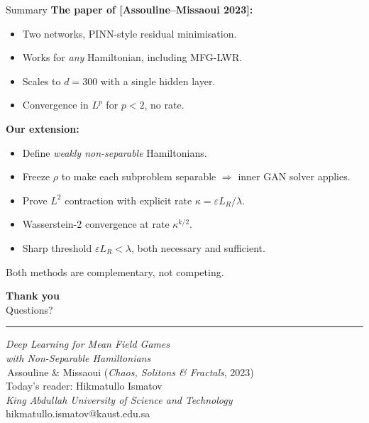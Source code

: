 \documentclass[10pt,aspectratio=169]{beamer}
\newcommand{\eps}{\varepsilon}
\newcommand{\teal}[1]{\textcolor{kaustteal}{#1}}
\newcommand{\blue}[1]{\textcolor{kaustblue}{#1}}
\newcommand{\citehl}[1]{\textcolor{kaustblue!80!black}{\textbf{[#1]}}}
\begin{document}
\begin{frame}{Summary}
\textbf{The paper of \citehl{Assouline--Missaoui 2023}:}
\begin{itemize}\setlength\itemsep{1pt}
  \item Two networks, PINN-style residual minimisation.
  \item Works for \emph{any} Hamiltonian, including MFG-LWR.
  \item Scales to $d=300$ with a single hidden layer.
  \item Convergence in $L^p$ for $p<2$, no rate.
\end{itemize}

\medskip
\textbf{Our extension:}
\begin{itemize}\setlength\itemsep{1pt}
  \item Define \emph{weakly non-separable} Hamiltonians.
  \item \blue{Freeze $\rho$} to make each subproblem separable
        $\Rightarrow$ inner GAN solver applies.
  \item Prove $L^2$ contraction with explicit rate
        $\kappa = \eps L_R/\lambda$.
  \item Wasserstein-2 convergence at rate $\kappa^{k/2}$.
  \item Sharp threshold $\eps L_R<\lambda$, both necessary and sufficient.
\end{itemize}

\medskip
\teal{Both methods are complementary, not competing.}
\end{frame}

{
\begin{frame}[plain]
\centering
\vspace{0.6cm}
{\Huge\textbf{Thank you}}\\[6pt]
{\Large Questions?}

\vspace{0.5cm}
\textcolor{kaustgold}{\rule{0.35\textwidth}{0.6pt}}
\vspace{0.4cm}

{\itshape Deep Learning for Mean Field Games\\
with Non-Separable Hamiltonians}\\[6pt]
\scriptsize\,Assouline \& Missaoui (\emph{Chaos, Solitons \& Fractals}, 2023)\\[16pt]

{\normalsize Today's reader: Hikmatullo Ismatov}\\
{\small\textsl{King Abdullah University of Science and Technology}}\\[10pt]

{\small\ttfamily hikmatullo.ismatov@kaust.edu.sa}
\end{frame}
}
\end{document}
